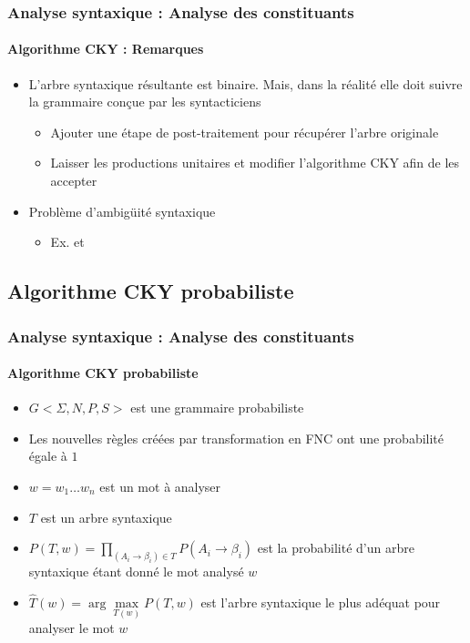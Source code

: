 \documentclass[xcolor=table]{beamer}
\begin{document}
\begin{frame}
\frametitle{Analyse syntaxique : Analyse des constituants}
\framesubtitle{Algorithme CKY : Remarques}

\begin{minipage}{.53\textwidth}
\begin{itemize}
	\item L'arbre syntaxique résultante est binaire. Mais, dans la réalité elle doit suivre la grammaire conçue par les syntacticiens
	\begin{itemize}
		\item Ajouter une étape de post-traitement pour récupérer l'arbre originale
		\item Laisser les productions unitaires et modifier l'algorithme CKY afin de les accepter
	\end{itemize}
	\item Problème d'ambigüité syntaxique 
	\begin{itemize}
		\item Ex.  et 
	\end{itemize}
\end{itemize}
\end{minipage}
\begin{minipage}{.45\textwidth}
\end{minipage}

\end{frame}

\subsection{Algorithme CKY probabiliste}

\begin{frame}
\frametitle{Analyse syntaxique : Analyse des constituants}
\framesubtitle{Algorithme CKY probabiliste}

\begin{itemize}
	\item $G<\Sigma, N, P, S>$ est une grammaire probabiliste
	\item Les nouvelles règles créées par transformation en FNC ont une probabilité égale à $1$
	\item $w = w_1 \ldots w_n$ est un mot à analyser 
	\item $T$ est un arbre syntaxique 
	\item $P(T, w) = \prod\limits_{(A_i \rightarrow \beta_i) \in T} P(A_i \rightarrow \beta_i)$ est la probabilité d'un arbre syntaxique étant donné le mot analysé $w$
	\item $\hat{T}(w) = \arg\max\limits_{T(w)} P(T, w) $ est l'arbre syntaxique le plus adéquat pour analyser le mot $w$
\end{itemize}

\end{frame}
\end{document}
